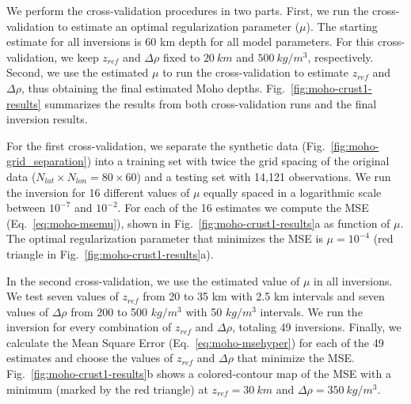 We perform the cross-validation procedures in two parts.
First, we run the cross-validation to estimate
an optimal regularization parameter ($\mu$).
The starting estimate for all inversions is
60 km depth for all model parameters.
For this cross-validation,
we keep $z_{ref}$ and $\Delta\rho$ fixed to
$20\ km$ and $500\ kg/m^3$, respectively.
Second, we use the estimated $\mu$ to run the cross-validation
to estimate $z_{ref}$ and $\Delta\rho$,
thus obtaining the final estimated Moho depths.
Fig.~\ref{fig:moho-crust1-results} summarizes the results
from both cross-validation runs and the final inversion results.

For the first cross-validation,
we separate the synthetic data (Fig.~\ref{fig:moho-grid_separation}) into
a training set with twice the grid spacing of the original data
($N_{lat} \times N_{lon} = 80 \times 60$)
and a testing set with 14,121 observations.
We run the inversion for 16 different values of $\mu$
equally spaced in a logarithmic scale between $10^{-7}$ and $10^{-2}$.
For each of the 16 estimates we compute the MSE (Eq.~\ref{eq:moho-msemu}),
shown in Fig.~\ref{fig:moho-crust1-results}a as function of $\mu$.
The optimal regularization parameter that minimizes the MSE is $\mu = 10^{-4}$
(red triangle in Fig.~\ref{fig:moho-crust1-results}a).

In the second cross-validation,
we use the estimated value of $\mu$ in all inversions.
We test seven values of $z_{ref}$ from 20 to 35 km with 2.5 km intervals
and seven values of $\Delta\rho$ from 200 to 500 $kg/m^3$
with 50 $kg/m^3$ intervals.
We run the inversion for every combination of $z_{ref}$ and $\Delta\rho$,
totaling 49 inversions.
Finally, we calculate the Mean Square Error (Eq.~\ref{eq:moho-msehyper})
for each of the 49 estimates
and choose the values of $z_{ref}$ and $\Delta\rho$ that minimize the MSE.
Fig.~\ref{fig:moho-crust1-results}b
shows a colored-contour map of the MSE
with a minimum (marked by the red triangle)
at $z_{ref} = 30\ km$ and $\Delta\rho = 350\ kg/m^3$.

